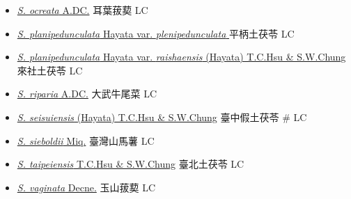\begin{itemize}
\begin{itemize}
        \item[] \href{http://www.theplantlist.org/tpl1.1/search?q=Smilax+ocreata}{\textit{S. ocreata} A.DC.}   耳葉菝葜   LC
        \item[] \href{http://www.theplantlist.org/tpl1.1/search?q=Smilax+planipedunculata+var.+plenipedunculata}{\textit{S. planipedunculata} Hayata var. \textit{plenipedunculata} }   平柄土茯苓   LC
        \item[] \href{http://www.theplantlist.org/tpl1.1/search?q=Smilax+planipedunculata+var.+raishaensis}{\textit{S. planipedunculata} Hayata var. \textit{raishaensis} (Hayata) T.C.Hsu \& S.W.Chung}   來社土茯苓   LC
        \item[] \href{http://www.theplantlist.org/tpl1.1/search?q=Smilax+riparia}{\textit{S. riparia} A.DC.}   大武牛尾菜   LC
        \item[] \href{http://www.theplantlist.org/tpl1.1/search?q=Smilax+seisuiensis}{\textit{S. seisuiensis} (Hayata) T.C.Hsu \& S.W.Chung}   臺中假土茯苓  \# LC
        \item[] \href{http://www.theplantlist.org/tpl1.1/search?q=Smilax+sieboldii}{\textit{S. sieboldii} Miq.}   臺灣山馬薯   LC
        \item[] \href{http://www.theplantlist.org/tpl1.1/search?q=Smilax+taipeiensis}{\textit{S. taipeiensis} T.C.Hsu \& S.W.Chung}   臺北土茯苓   LC
        \item[] \href{http://www.theplantlist.org/tpl1.1/search?q=Smilax+vaginata}{\textit{S. vaginata} Decne.}   玉山菝葜   LC
  \end{itemize}
  \end{itemize}
